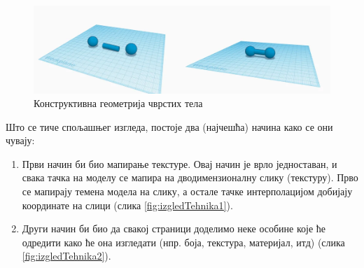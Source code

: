 \documentclass[12pt]{article}
\begin{document}
	\begin{figure}[H]
		\centering
		\includegraphics[max width=0.9\linewidth]{slike/strukturePodatakaGeometrijaTehnika3.png}
		\caption{Конструктивна геометрија чврстих тела}
		\label{fig:geomTehnika3}
	\end{figure}

	Што се тиче спољашњег изгледа, постоје два (најчешћа) начина како се они чувају:
	\begin{enumerate}
	\item Први начин би био мапирање текстуре. Овај начин је врло једноставан, и свака тачка на моделу се мапира на дводимензионалну слику (текстуру). Прво се мапирају темена модела на слику, а остале тачке интерполацијом добијају координате на слици (слика \ref{fig:izgledTehnika1}).
	\item Други начин би био да свакој страници доделимо неке особине које ће одредити како ће она изгледати (нпр. боја, текстура, материјал, итд) (слика \ref{fig:izgledTehnika2}).
	\end{enumerate}
\end{document}
